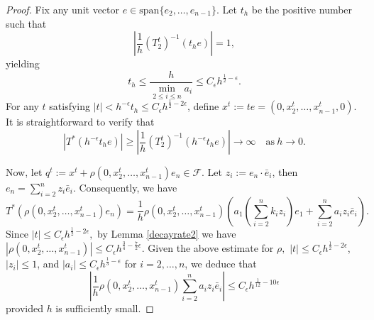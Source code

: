 \documentclass[11pt]{amsart}
\theoremstyle{plain}
\newcommand{\0}{\textbf{0}}
\numberwithin{equation}{section}
\numberwithin{equation}{section}
\numberwithin{figure}{section}
\begin{document}
\begin{proof}
Fix any unit vector $e \in \text{span}\{e_2, \ldots, e_{n-1}\}$. Let $t_h$ be the positive number such that
\[
\left|\frac{1}{h}(T_2^t)^{-1}(t_he)\right| = 1,
\]
yielding
\[
t_h \leq \frac{h}{\min_{2 \leq i \leq n} a_i} \leq C_\epsilon h^{\frac{1}{2} - \epsilon}.
\]
For any $t$ satisfying $|t| < h^{-\epsilon}t_h\leq C_\epsilon h^{\frac{1}{2} - 2\epsilon}$, define $x^t := te = (0, x^t_2, \ldots, x^t_{n-1}, 0)$. It is straightforward to verify that 
\begin{equation}\label{bp112}
\left|T^*(h^{-\epsilon}t_he)\right|\geq \left|\frac{1}{h}(T_2^t)^{-1}(h^{-\epsilon}t_he)\right| \rightarrow \infty\quad \text{as}\ h \rightarrow 0.
\end{equation}

Now, let $q^t := x^t + \rho(0, x^t_2, \ldots, x^t_{n-1})e_n \in \mathcal{F}$. Let $z_i := e_n \cdot \bar{e}_i$, then $e_n = \sum_{i=2}^n z_i \bar{e}_i$. Consequently, we have
\[
T^*(\rho(0, x^t_2, \ldots, x^t_{n-1})e_n) = \frac{1}{h}\rho(0, x^t_2, \ldots, x^t_{n-1})\left(a_1\left(\sum_{i=2}^n k_iz_i\right)e_1 + \sum_{i=2}^n a_iz_i \bar{e}_i\right).
\]
Since $|t| \leq C_\epsilon h^{\frac{1}{2} - 2\epsilon},$ by Lemma \ref{decayrate2} we have 
$\left|\rho(0, x^t_2, \ldots, x^t_{n-1})\right| \leq C_\epsilon h^{\frac{3}{4}-\frac{7}{2}\epsilon}.$
Given the above estimate for $\rho,$ $|t| \leq C_\epsilon h^{\frac{1}{2} - 2\epsilon}$, $|z_i| \leq 1$, and $|a_i| \leq C_\epsilon h^{\frac{1}{3} - \epsilon}$ for $i = 2, \ldots, n$, we deduce that
\[
\left|\frac{1}{h}\rho(0, x^t_2, \ldots, x^t_{n-1})\sum_{i=2}^n a_iz_i \bar{e}_i\right| \leq C_\epsilon h^{\frac{1}{12} - 10\epsilon}
\]
provided $h$ is sufficiently small.



\end{proof}
\end{document}
